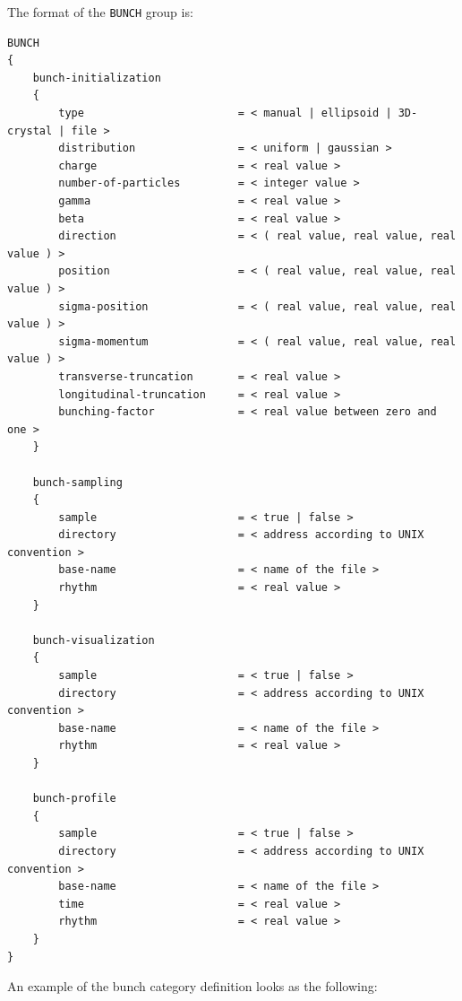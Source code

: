 The format of the \texttt{BUNCH} group is:
\begin{Verbatim}[frame=single,fontsize=\small,tabsize=4]
BUNCH
{
	bunch-initialization
	{
		type                        = < manual | ellipsoid | 3D-crystal | file >
		distribution                = < uniform | gaussian >
		charge                      = < real value >
		number-of-particles         = < integer value >
		gamma                       = < real value >
		beta                        = < real value >
		direction                   = < ( real value, real value, real value ) >
		position                    = < ( real value, real value, real value ) >
		sigma-position              = < ( real value, real value, real value ) >
		sigma-momentum              = < ( real value, real value, real value ) >
		transverse-truncation       = < real value >
		longitudinal-truncation     = < real value >
		bunching-factor             = < real value between zero and one >
	}
	
	bunch-sampling
	{
		sample                      = < true | false >
		directory                   = < address according to UNIX convention >
		base-name                   = < name of the file >
		rhythm                      = < real value >
	}
	
	bunch-visualization
	{
		sample                      = < true | false >
		directory                   = < address according to UNIX convention >
		base-name                   = < name of the file >
		rhythm                      = < real value >
	}

	bunch-profile
	{
		sample                      = < true | false >
		directory                   = < address according to UNIX convention >
		base-name                   = < name of the file >
		time                        = < real value >
        rhythm                      = < real value >
	}
}
\end{Verbatim}
An example of the bunch category definition looks as the following:

